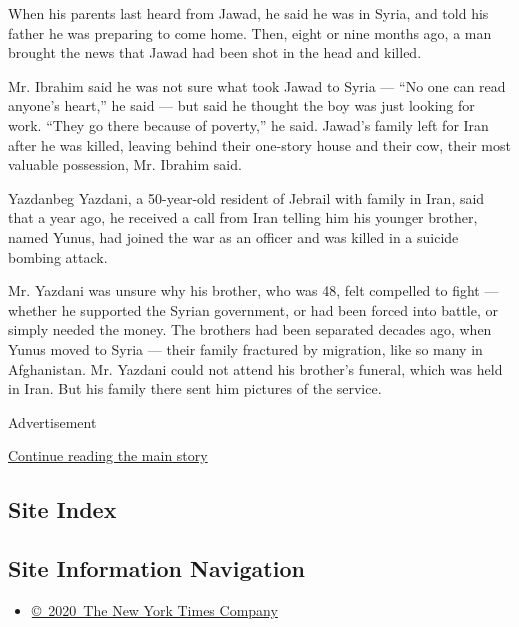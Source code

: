 When his parents last heard from Jawad, he said he was in Syria, and
told his father he was preparing to come home. Then, eight or nine
months ago, a man brought the news that Jawad had been shot in the head
and killed.

Mr. Ibrahim said he was not sure what took Jawad to Syria --- ``No one
can read anyone's heart,'' he said --- but said he thought the boy was
just looking for work. ``They go there because of poverty,'' he said.
Jawad's family left for Iran after he was killed, leaving behind their
one-story house and their cow, their most valuable possession, Mr.
Ibrahim said.

Yazdanbeg Yazdani, a 50-year-old resident of Jebrail with family in
Iran, said that a year ago, he received a call from Iran telling him his
younger brother, named Yunus, had joined the war as an officer and was
killed in a suicide bombing attack.

Mr. Yazdani was unsure why his brother, who was 48, felt compelled to
fight --- whether he supported the Syrian government, or had been forced
into battle, or simply needed the money. The brothers had been separated
decades ago, when Yunus moved to Syria --- their family fractured by
migration, like so many in Afghanistan. Mr. Yazdani could not attend his
brother's funeral, which was held in Iran. But his family there sent him
pictures of the service.

Advertisement

\protect\hyperlink{after-bottom}{Continue reading the main story}

\hypertarget{site-index}{%
\subsection{Site Index}\label{site-index}}

\hypertarget{site-information-navigation}{%
\subsection{Site Information
Navigation}\label{site-information-navigation}}

\begin{itemize}
\tightlist
\item
  \href{https://help.nytimes3xbfgragh.onion/hc/en-us/articles/115014792127-Copyright-notice}{©~2020~The
  New York Times Company}
\end{itemize}

